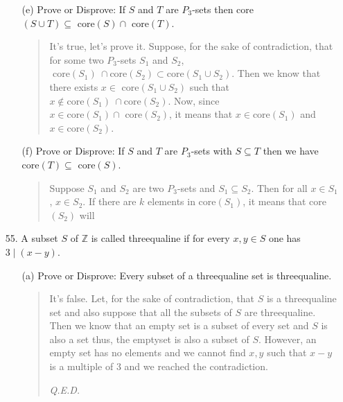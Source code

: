 \documentclass[12pt, a4paper]{article}                      %
\begin{document}
\begin{itemize}
\begin{itemize}
\item[(e)]
Prove or Disprove: If $S$ and $T$ are $P_3$-sets then core$(S \cup T) \subseteq \mbox{ core}(S) \cap \mbox{ core}(T)$.
\begin{quote}
It's true, let's prove it. Suppose, for the sake of contradiction, that for some two $P_3$-sets $S_1$ and $S_2$,
$\mbox{ core}(S_1) \ \cap \mbox{core}(S_2) \subset  \mbox{core}(S_1 \cup S_2)$. Then we know that there exists $x \in$ core$(S_1 \cup S_2)$ such that $x \notin \mbox{core}(S_1) \ \cap \mbox{core}(S_2)$. Now, since $x \in \mbox{core}(S_1) \cap \mbox{ core}(S_2)$, it means that $x \in \mbox{core}(S_1)$ and $x \in \mbox{core}(S_2)$.
\end{quote} 

\item[]
\item[(f)]
Prove or Disprove: If $S$ and $T$ are $P_3$-sets with $S \subseteq T$ then we have $\mbox{core}(T) \subseteq \mbox{ core}(S)$.
\begin{quote}
Suppose $S_1$ and $S_2$ are two $P_3$-sets and $S_1 \subseteq S_2$. Then for all $x \in S_1$, $x \in S_2$.
If there are $k$ elements in core$(S_1)$, it means that core$(S_2)$ will 
\end{quote}
\end{itemize}

\item[]
\item[]

\item[55.]
A subset $S$ of $\mathbb{Z}$ is called threequaline if for every $x, y \in S$ one has $3 \mid (x - y)$.
\begin{itemize}
\item[(a)]
Prove or Disprove: Every subset of a threequaline set is threequaline.
\begin{quote}
It's false. Let, for the sake of contradiction, that $S$ is a threequaline set and also suppose that all the subsets of $S$ are threequaline. Then we know that an empty set is a subset of every set and $S$ is also a set thus, the emptyset is also a subset of $S$. However, an empty set has no elements and we cannot find $x, y$ such that $x - y$ is a multiple of 3 and we reached the contradiction.
\begin{flushright}
\textit{Q.E.D.}
\end{flushright}
\end{quote}

\item[]


\end{itemize}
\end{itemize}
\end{document}
